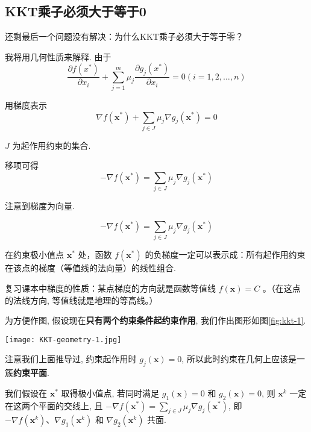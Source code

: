 \subsection{KKT乘子必须大于等于0}

\begin{problem}
    还剩最后一个问题没有解决：为什么KKT乘子必须大于等于零？
\end{problem}

我将用几何性质来解释. 由于
$$
\frac{\partial f\left(x^{*}\right)}{\partial x_{i}}+\sum_{j=1}^{m} \mu_{j} \frac{\partial g_{j}\left(x^{*}\right)}{\partial x_{i}}=0(i=1,2, \ldots, n)
$$

用梯度表示 $$ \nabla f\left(\mathbf{x}^{*}\right)+\sum_{j \in J} \mu_{j} \nabla g_{j}\left(\mathbf{x}^{*}\right)=0$$

$J$ 为起作用约束的集合.

移项可得 $$ -\nabla f\left(\mathbf{x}^{*}\right)=\sum_{j \in J} \mu_{j} \nabla g_{j}\left(\mathbf{x}^{*}\right) $$

注意到梯度为向量. 

\begin{theorem}
    $$ -\nabla f\left(\mathbf{x}^{*}\right)=\sum_{j \in J} \mu_{j} \nabla g_{j}\left(\mathbf{x}^{*}\right) $$

    在约束极小值点 $ \mathbf{x}^{*} $ 处，函数 $ f\left(\mathbf{x}^{*}\right) $ 的负梯度一定可以表示成：所有起作用约束在该点的梯度（等值线的法向量）的线性组合.
\end{theorem}


\begin{corollary}[梯度的性质]
    复习课本中梯度的性质：某点梯度的方向就是函数等值线 $ f(\mathbf{x})=C $ 。（在这点的法线方向, 等值线就是地理的等高线。）
\end{corollary}

为方便作图, 假设现在\textbf{只有两个约束条件起约束作用}, 我们作出图形如图\ref{fig:kkt-1}.

\begin{FigureCenter}{}
    \label{fig:kkt-1}
    \texttt{[image: KKT-geometry-1.jpg]}
\end{FigureCenter}


注意我们上面推导过, 约束起作用时 $ g_{j}(\mathbf{x})=0 $, 所以此时约束在几何上应该是一簇\textbf{约束平面}.

我们假设在 $ \mathbf{x}^{*} $ 取得极小值点, 若同时满足 $ g_{1}(\mathbf{x})=0 $ 和 $ g_{2}(\mathbf{x})=0 $, 则 $ \mathbf{x}^{k} $ 一定在这两个平面的交线上, 且 $ -\nabla f\left(\mathbf{x}^{*}\right)=\sum_{j \in J} \mu_{j} \nabla g_{j}\left(\mathbf{x}^{*}\right) $, 即 $ -\nabla f\left(\mathbf{x}^{k}\right) 、 \nabla g_{1}\left(\mathbf{x}^{k}\right) $ 和 $ \nabla g_{2}\left(\mathbf{x}^{k}\right) $ 共面.

